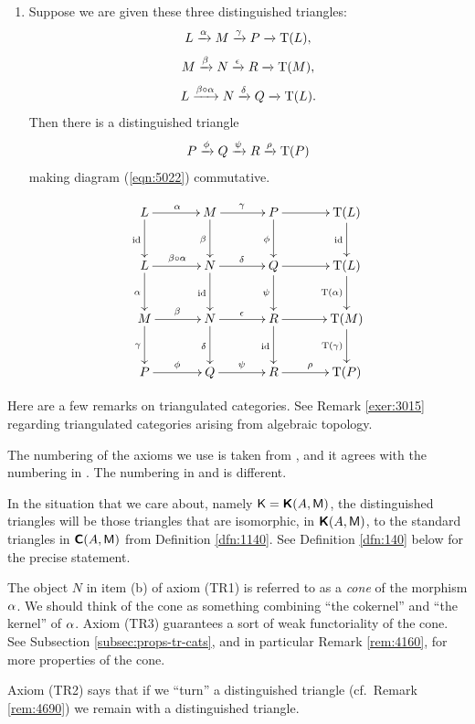 \begin{dfn}
\begin{enumerate}[leftmargin=30pt]
\item[(TR4)] Suppose we are given these three distinguished triangles:
\[ L \xrightarrow{\alpha} M \xrightarrow{\gamma} P \xrightarrow{} \operatorname{T}(L) , \]
\[ M \xrightarrow{\beta} N \xrightarrow{\epsilon} R \xrightarrow{} \operatorname{T}(M) , \]
\[ L \xrightarrow{\beta \circ \alpha} N \xrightarrow{\delta} Q \xrightarrow{} \operatorname{T}(L) . \]
Then there is a distinguished triangle 
\[  P \xrightarrow{\phi} Q \xrightarrow{\psi} R \xrightarrow{\rho} \operatorname{T}(P)  \]
making diagram (\ref{eqn:5022}) commutative. 
\begin{figure}[!htb]
\centering
\begin{equation} \label{eqn:5022}
\UseTips  \xymatrix @C=8ex @R=6ex { 
L 
\ar[r]^{\al}
\ar[d]_{\opn{id}}
&
M
\ar[r]^{\ga}
\ar[d]_{\be}
& 
P
\ar[r]^{}
\ar[d]_{\phi}
&
\opn{T}(L)
\ar[d]_{\opn{id}}
\\
L
\ar[r]^{\be \circ \al}
\ar[d]_{\al}
&
N
\ar[r]^{\de}
\ar[d]_{\opn{id}}
& 
Q
\ar[r]^{}
\ar[d]_{\psi}
&
\opn{T}(L)
\ar[d]_{\opn{T}(\al)}
\\
M
\ar[r]^{\be}
\ar[d]_{\ga}
&
N
\ar[r]^{\ep}
\ar[d]_{\de}
& 
R
\ar[r]^{}
\ar[d]_{\opn{id}}
&
\opn{T}(M)
\ar[d]_{\opn{T}(\ga)}
\\
P
\ar[r]^{\phi}
&
Q
\ar[r]^{\psi}
& 
R
\ar[r]^{\rho}
&
\opn{T}(P)
} 
\end{equation}
\end{figure}
\end{enumerate}
\end{dfn}

Here are a few remarks on triangulated categories. See Remark \ref{exer:3015} 
regarding triangulated categories arising from algebraic topology. 

\begin{rem} \label{rem:1280}
The numbering of the axioms we use is taken from \cite{RD}, and it agrees with 
the numbering in \cite{We}. The numbering in \cite{KaSc1} and \cite{KaSc2}  
is different.

In the situation that we care about, namely 
$\operatorname{\mathsf{K}} = \boldsymbol{\mathsf{K}}(A, \operatorname{\mathsf{M}})$,
the distinguished triangles will be those triangles that are isomorphic, in 
$\boldsymbol{\mathsf{K}}(A, \operatorname{\mathsf{M}})$, to the standard triangles in $\boldsymbol{\mathsf{C}}(A, \operatorname{\mathsf{M}})$
from Definition \ref{dfn:1140}. 
See Definition \ref{dfn:140} below for the precise statement. 

The object $N$ in item (b) of axiom (TR1) is referred to as a {\em cone} of the 
morphism $\alpha$. We should think of the cone as something combining 
``the cokernel'' and ``the kernel'' of $\alpha$. 
Axiom (TR3) guarantees a sort of weak functoriality of the cone. 
See Subsection \ref{subsec:props-tr-cats}, and in particular 
Remark \ref{rem:4160}, for more properties of the cone.

Axiom (TR2) says that if we ``turn'' a distinguished triangle (cf.\ Remark 
\ref{rem:4690}) we remain with a distinguished triangle.
\end{rem}

